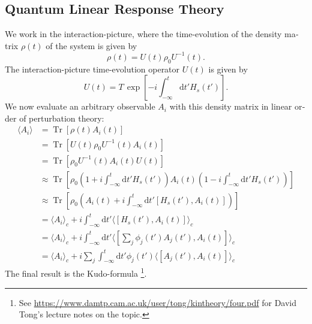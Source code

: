 \documentclass[master,       %
               twoside,        %
               BCOR10mm,       %
               english,ngerman, %
               ]{GAUBM}
\begin{document}
\begin{otherlanguage}{english}
\section{Quantum Linear Response Theory}
We work in the interaction-picture, where the time-evolution of the density matrix $\rho(t)$ of the system is given by
\begin{equation}
    \rho(t) = U(t) \rho_0 U^{-1}(t).
\end{equation}
The interaction-picture time-evolution operator $U(t)$ is given by
\begin{equation}
    U(t) = T \, \exp \left[ - i \int_{-\infty}^t  \mathrm{d} t' H_s(t') \right].
\end{equation}
We now evaluate an arbitrary observable $A_i$ with this density matrix in linear order of perturbation theory:
\begin{align}
	\label{eq:linear_response}
    \langle A_i \rangle &= \operatorname{Tr} \left[ \rho(t) A_i(t) \right] \nonumber \\
    &= \operatorname{Tr} \left[ U(t) \rho_0 U^{-1}(t) A_i(t) \right] \nonumber \\
    &= \operatorname{Tr} \left[ \rho_0 U^{-1}(t) A_i(t) U(t) \right] \nonumber \\
    &\approx \operatorname{Tr} \left[ \rho_0 (1 + i \int_{-\infty}^t \mathrm{d} t' H_s(t')) A_i(t) (1 - i \int_{-\infty}^t \mathrm{d} t' H_s(t')) \right] \nonumber \\
    &\approx \operatorname{Tr} \left[ \rho_0 (A_i(t) + i \int_{-\infty}^t \mathrm{d} t' [H_s(t'), A_i(t)] ) \right] \nonumber \\
    &= \langle A_i \rangle_c + i \int_{-\infty}^t \mathrm{d} t' \langle [H_s(t'), A_i(t)] \rangle_c \nonumber \\
    &= \langle A_i \rangle_c + i \int_{-\infty}^t \mathrm{d} t' \langle [\sum_j \phi_j(t') A_j(t'), A_i(t)] \rangle_c  \nonumber \\
    &= \langle A_i \rangle_c + i \sum_j \int_{-\infty}^t \mathrm{d} t' \phi_j(t') \langle [A_j(t'), A_i(t)] \rangle_c
\end{align}
The final result is the Kudo-formula \footnote{See \url{https://www.damtp.cam.ac.uk/user/tong/kintheory/four.pdf} for David Tong's lecture notes on the topic.}.



\end{otherlanguage}
\end{document}
